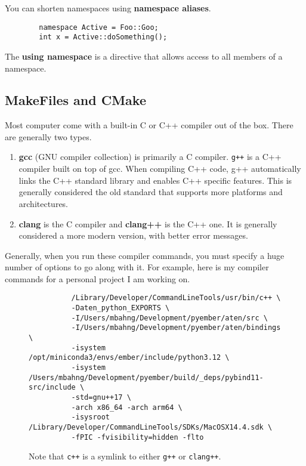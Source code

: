\documentclass{article}
\begin{document}
    \begin{lemma}
      You can shorten namespaces using \textbf{namespace aliases}. 
      \begin{lstlisting}
        namespace Active = Foo::Goo; 
        int x = Active::doSomething(); 
      \end{lstlisting}
    \end{lemma}

    \begin{lemma}
      The \textbf{using namespace} is a directive that allows access to all members of a namespace. 
    \end{lemma}

  \subsection{MakeFiles and CMake} 
    
      Most computer come with a built-in C or C++ compiler out of the box. There are generally two types. 
      \begin{enumerate}
        \item \textbf{gcc} (GNU compiler collection) is primarily a C compiler. \texttt{g++} is a C++ compiler built on top of gcc. When compiling C++ code, g++ automatically links the C++ standard library and enables C++ specific features. This is generally considered the old standard that supports more platforms and architectures.  
        \item \textbf{clang} is the C compiler and \textbf{clang++} is the C++ one. It is generally considered a more modern version, with better error messages. 
      \end{enumerate} 

      Generally, when you run these compiler commands, you must specify a huge number of options to go along with it. For example, here is my compiler commands for a personal project I am working on. 

      \begin{figure}[H]
        \centering 
        \begin{lstlisting}
          /Library/Developer/CommandLineTools/usr/bin/c++ \
          -Daten_python_EXPORTS \
          -I/Users/mbahng/Development/pyember/aten/src \
          -I/Users/mbahng/Development/pyember/aten/bindings \
          -isystem /opt/miniconda3/envs/ember/include/python3.12 \
          -isystem /Users/mbahng/Development/pyember/build/_deps/pybind11-src/include \
          -std=gnu++17 \
          -arch x86_64 -arch arm64 \
          -isysroot /Library/Developer/CommandLineTools/SDKs/MacOSX14.4.sdk \
          -fPIC -fvisibility=hidden -flto 
        \end{lstlisting}
        \caption{Note that \texttt{c++} is a symlink to either \texttt{g++} or \texttt{clang++}.} 
        \label{fig:com_code}
      \end{figure} 
\end{document}
